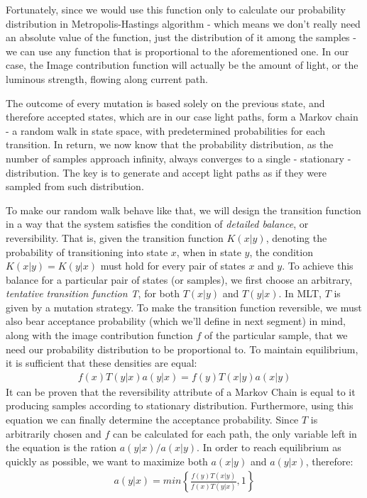 Fortunately, since we would use this function only to calculate our probability distribution in Metropolis-Hastings algorithm - which means we don't really need an absolute value of the function, just the distribution of it among the samples - we can use any function that is proportional to the aforementioned one. In our case, the Image contribution function will actually be the amount of light, or the luminous strength, flowing along current path.

The outcome of every mutation is based solely on the previous state, and therefore accepted states, which are in our case light paths, form a Markov chain - a random walk in state space, with predetermined probabilities for each transition. In return, we now know that the probability distribution, as the number of samples approach infinity, always converges to a single - stationary - distribution. The key is to generate and accept light paths as if they were sampled from such distribution.

To make our random walk behave like that, we will design the transition function in a way that the system satisfies the condition of \emph{detailed balance}, or reversibility. That is, given the transition function $K(x|y)$, denoting the probability of transitioning into state $x$, when in state $y$, the condition $K(x|y) = K(y|x)$ must hold for every pair of states $x$ and $y$. To achieve this balance for a particular pair of states (or samples), we first choose an arbitrary, \emph{tentative transition function T}, for both $T(x|y)$ and $T(y|x)$. In MLT, $T$ is given by a mutation strategy. To make the transition function reversible, we must also bear acceptance probability (which we'll define in next segment) in mind, along with the image contribution function $f$ of the particular sample, that we need our probability distribution to be proportional to. To maintain equilibrium, it is sufficient that these densities are equal: 
\begin{align*}
f(x)T(y|x)a(y|x)=f(y)T(x|y)a(x|y)
\end{align*}
It can be proven that the reversibility attribute of a Markov Chain is equal to it producing samples according to stationary distribution. Furthermore, using this equation we can finally determine the acceptance probability. Since $T$ is arbitrarily chosen and $f$ can be calculated for each path, the only variable left in the equation is the ration $a(y|x)/a(x|y)$. In order to reach equilibrium as quickly as possible, we want to maximize both $a(x|y)$ and $a(y|x)$, therefore:
\begin{align*}
a(y|x)=min\left\{\frac{f(y)T(x|y)}{f(x)T(y|x)}, 1\right\}
\end{align*}    

